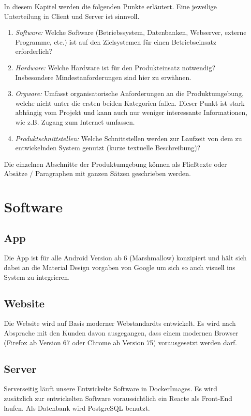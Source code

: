\begin{tcolorbox}
In diesem Kapitel werden die folgenden Punkte erläutert. Eine jeweilige Unterteilung in Client und Server ist sinnvoll.
\begin{enumerate}
	\item \textit{Software:} Welche Software (Betriebssystem, Datenbanken, Webserver, externe Programme, etc.) ist auf den Zielsystemen für einen Betriebseinsatz erforderlich?
	\item \textit{Hardware:} Welche Hardware ist für den Produkteinsatz notwendig? Insbesondere Mindestanforderungen sind hier zu erwähnen.
	\item \textit{Orgware:} Umfasst organisatorische Anforderungen an die Produktumgebung, welche nicht unter die ersten beiden Kategorien fallen. 
	Dieser Punkt ist stark abhängig vom Projekt und kann auch nur weniger interessante Informationen, wie z.B. Zugang zum Internet umfassen.
	\item \textit{Produktschnittstellen:} Welche Schnittstellen werden zur Laufzeit von dem zu entwickelnden System genutzt (kurze textuelle Beschreibung)?
\end{enumerate}

\noindent Die einzelnen Abschnitte der Produktumgebung können als Fließtexte oder Absätze / Paragraphen mit ganzen Sätzen geschrieben werden.
\end{tcolorbox}

\section{Software}

\subsection{App}
Die App ist für alle Android Version ab 6 (Marshmallow) konzipiert und hält sich dabei an die Material Design vorgaben von Google um sich so auch visuell ins System zu integrieren.

\subsection{Website}
Die Website wird auf Basis moderner Webstandardts entwickelt. Es wird nach Absprache mit den Kunden davon ausgegangen, dass einem modernen Browser (Firefox ab Version 67 oder Chrome ab Version 75) vorausgesetzt werden darf.

\subsection{Server} 
Serverseitig läuft unsere Entwickelte Software in DockerImages. Es wird zusätzlich zur entwickelten Software voraussichtlich ein Reacte als Front-End laufen.
Als Datenbank wird PostgreSQL benutzt.

